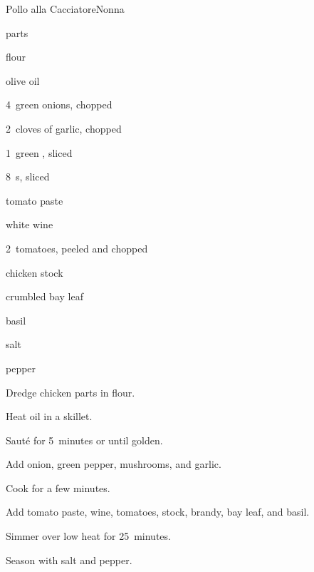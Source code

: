 \begin{recipe}{Pollo alla Cacciatore}{Nonna}{}

\begin{ingredients}
\item {}  parts
\item \C{\half} flour
\item {} olive oil
\item 4~green onions, chopped
\item 2~cloves of garlic, chopped
\item 1~green , sliced
\item 8~s, sliced
\item {} tomato paste
\item \C{\half} white wine
\item 2~tomatoes, peeled and chopped
\item \C{\threequarter} chicken stock
\item \C{\quarter} 
\item crumbled bay leaf
\item basil
\item salt
\item pepper
\end{ingredients}

\begin{directions}
\item Dredge chicken parts in flour.
\item Heat oil in a skillet.
\item Sauté for 5~minutes or until golden.
\item Add onion, green pepper, mushrooms, and garlic.
\item Cook for a few minutes.
\item Add tomato paste, wine, tomatoes, stock, brandy, bay leaf, and basil.
\item Simmer over low heat for 25~minutes.
\item Season with salt and pepper.
\end{directions}

\end{recipe}
